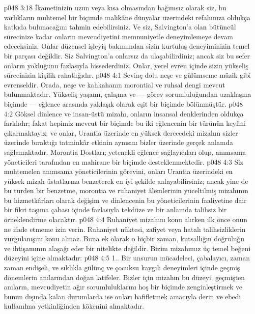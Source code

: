 \vs p048 3:18 İkametinizin uzun veya kısa olmasından bağımsız olarak siz, bu varlıkların muhtemel bir biçimde malikâne dünyalar üzerindeki refahınıza oldukça katkıda bulunacağını tahmin edebilirsiniz. Ve siz, Salvington’a olan bütüncül sürecinize kadar onların mevcudiyetini memnuniyetle deneyimlemeye devam edeceksiniz. Onlar düzensel işleyiş bakımından sizin kurtuluş deneyiminizin temel bir parçası değildir. Siz Salvington’a onlarsız da ulaşabilirdiniz; ancak siz bu sefer onların yokluğunu fazlasıyla hissederdiniz. Onlar, yerel evren içinde sizin yükseliş sürecinizin kişilik rahatlığıdır.
\vs p048 4:1 Sevinç dolu neşe ve gülümseme müzik gibi evrenseldir. Orada, neşe ve kahkahanın morontial ve ruhsal dengi mevcut bulunmaktadır. Yükseliş yaşamı, çalışma ve --- görev sorumluluğundan uzaklaşma biçimde --- eğlence arasında yaklaşık olarak eşit bir biçimde bölünmüştür.
\vs p048 4:2 Göksel dinlence ve insan\hyp{}üstü mizahı, onların insansal denklerinden oldukça farklıdır; fakat hepimiz mevcut bir biçimde bu iki eğlencenin bir türünün keyfini çıkarmaktayız; ve onlar, Urantia üzerinde en yüksek derecedeki mizahın sizler üzerinde bıraktığı tatminkâr etkinin aynısını bizler üzerinde gerçek anlamda sağlamaktadır. Morontia Dostları; yetenekli eğlence sağlayıcıları olup, anımsama yöneticileri tarafından en mahirane bir biçimde desteklenmektedir.
\vs p048 4:3 Siz muhtemelen anımsama yöneticilerinin görevini, onları Urantia üzerindeki en yüksek mizah üstatlarına benzeterek en iyi şekilde anlayabilirsiniz; ancak yine de bu türden bir benzetme, morontia ve ruhaniyet âlemlerinin yüceltilmiş mizahının bu hizmetkârları olarak değişim ve dinlencenin bu yöneticilerinin faaliyetine dair bir fikri taşıma çabası içinde fazlasıyla tekdüze ve bir anlamda talihsiz bir örneklendirme olacaktır.
\vs p048 4:4 Ruhaniyet mizahını konu alırken ilk önce onun ne  ifade etmeme izin verin. Ruhaniyet nüktesi, zafiyet veya hatalı talihsizliklerin vurgulanışını konu almaz. Buna ek olarak o hiçbir zaman, kutsallığın doğruluğu ve ihtişamının alaşağı eder bir nitelikte değildir. Bizim mizahımız üç temel beğeni düzeyini içine almaktadır:
\vs p048 4:5 1.\bibnobreakspace {}. Bir unsurun mücadeleci, çabalayıcı, zaman zaman endişeli, ve sıklıkla gülünç ve çocuksu kaygılı deneyimleri içinde geçmiş dönemlerin anılarından doğan latifeler. Bizler için mizahın bu düzeyi; geçmişten anıların, mevcudiyetin ağır sorumluluklarını hoş bir biçimde zenginleştirmek ve bunun dışında kalan durumlarda ise onları hafifletmek amacıyla derin ve ebedi kullanılma yetkinliğinden kökenini almaktadır.
